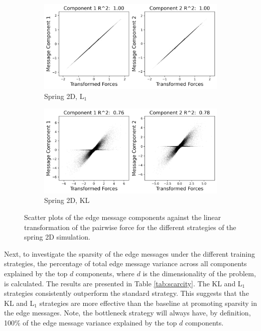 \documentclass[11pt]{article}
\begin{document}
\begin{figure}[H]
        \begin{subfigure}{0.45\textwidth}
            \includegraphics[width=\textwidth]{figs/spring_2d_l1_r2.png}
            \caption{Spring 2D, L$_1$}
        \end{subfigure}
        \begin{subfigure}{0.45\textwidth}
            \includegraphics[width=\textwidth]{figs/spring_2d_kl_r2.png}
            \caption{Spring 2D, KL}
        \end{subfigure}
        \caption{Scatter plots of the edge message components against the linear transformation of the pairwise force for the different strategies of the spring 2D simulation.}
        \label{fig:scatter_plots}
    \end{figure}
    Next, to investigate the sparsity of the edge messages under the different training strategies, the percentage of total edge message variance across all components explained by the top $d$ components, where $d$ is the dimensionality of the problem, is calculated. The results are presented in Table \ref{tab:scarcity}. The KL and L$_1$ strategies consistently outperform the standard strategy. This suggests that the KL and L$_1$ strategies are more effective than the baseline at promoting sparsity in the edge messages. Note, the bottleneck strategy will always have, by definition, 100\% of the edge message variance explained by the top $d$ components.
\end{document}
